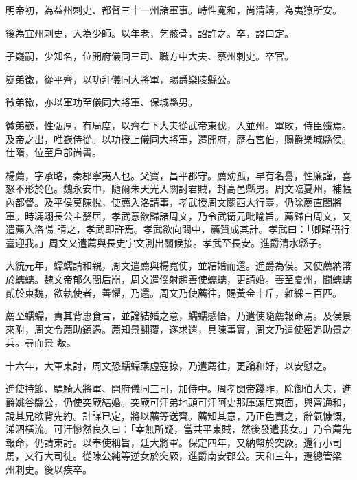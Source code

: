 \begin{pinyinscope}
 明帝初，為益州刺史、都督三十一州諸軍事。峙性寬和，尚清靖，為夷獠所安。



 後為宜州刺史，入為少師。以年老，乞骸骨，詔許之。卒，謚曰定。



 子嶷嗣，少知名，位開府儀同三司、職方中大夫、蔡州刺史。卒官。



 嶷弟徵，從平齊，以功拜儀同大將軍，賜爵樂陵縣公。



 徵弟徽，亦以軍功至儀同大將軍、保城縣男。



 徽弟嶔，性弘厚，有局度，以齊右下大夫從武帝東伐，入並州。軍敗，侍臣殲焉。及帝之出，唯嶔侍從。以功授上儀同大將軍，遷開府，歷右宮伯，賜爵樂城縣侯。仕隋，位至戶部尚書。



 楊薦，字承略，秦郡寧夷人也。父寶，昌平郡守。薦幼孤，早有名譽，性廉謹，喜怒不形於色。魏永安中，隨爾朱天光入關討君賊，封高邑縣男。周文臨夏州，補帳內都督。及平侯莫陳悅，使薦入洛請事，孝武授周文關西大行臺，仍除薦直閤將軍。時馮翊長公主嫠居，孝武意欲歸諸周文，乃令武衛元毗喻旨。薦歸白周文，又遣薦入洛陽
 請之，孝武即許焉。孝武欲向關中，薦贊成其計。孝武曰：「卿歸語行臺迎我。」周文又遣薦與長史宇文測出關候接。孝武至長安。進爵清水縣子。



 大統元年，蠕蠕請和親，周文遣薦與楊寬使，並結婚而還。進爵為侯。又使薦納幣於蠕蠕。魏文帝郁久閭后崩，周文遣僕射趙善使蠕蠕，更請婚。善至夏州，聞蠕蠕貳於東魏，欲執使者，善懼，乃還。周文乃使薦往，賜黃金十斤，雜綵三百匹。



 薦至蠕蠕，責其背惠食言，並論結婚之意，蠕蠕感悟，乃遣使隨薦報命焉。及侯景來附，周文令薦助鎮遏。薦知景翻覆，遂求還，具陳事實，周文乃遣使密追助景之兵。尋而景
 叛。



 十六年，大軍東討，周文恐蠕蠕乘虛寇掠，乃遣薦往，更論和好，以安慰之。



 進使持節、驃騎大將軍、開府儀同三司，加侍中。周孝閔帝踐阼，除御伯大夫，進爵姚谷縣公，仍使突厥結婚。突厥可汗弟地頭可汗阿史那庫頭居東面，與齊通和，說其兄欲背先約。計謀已定，將以薦等送齊。薦知其意，乃正色責之，辭氣慷慨，涕泗橫流。可汗慘然良久曰：「幸無所疑，當共平東賊，然後發遣我女。」乃令薦先報命，仍請東討。以奉使稱旨，廷大將軍。保定四年，又納幣於突厥。還行小司馬，又行大司徒。從陳公純等逆女於突厥，進爵南安郡公。天和三年，遷總管梁
 州刺史。後以疾卒。




\end{pinyinscope}

